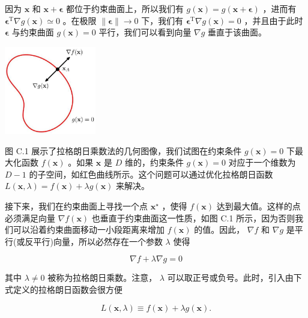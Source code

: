 \documentclass[10pt]{report}
\begin{document}
因为 \(\mathbf{x}\) 和 \(\mathbf{x} + \mathbf{\epsilon }\) 都位于约束曲面上，所以我们有 \(g\left( \mathbf{x}\right)  = g\left( {\mathbf{x} + \mathbf{\epsilon }}\right)\) ，进而有 \({\mathbf{\epsilon }}^{\mathrm{T}}\nabla g\left( \mathbf{x}\right)  \simeq  0\) 。在极限 \(\parallel \mathbf{\epsilon }\parallel  \rightarrow  0\) 下，我们有 \({\mathbf{\epsilon }}^{\mathrm{T}}\nabla g\left( \mathbf{x}\right)  = 0\) ，并且由于此时 \(\mathbf{\epsilon }\) 与约束曲面 \(g\left( \mathbf{x}\right)  = 0\) 平行，我们可以看到向量 \(\nabla g\) 垂直于该曲面。

\begin{center}
\includegraphics[max width=0.3\textwidth]{images/0194e279-9b28-703a-88f4-c3ac21e2010d_641_1087_344_461_443_0.jpg}
\end{center}
\hspace*{3em} 

图 C.1 展示了拉格朗日乘数法的几何图像，我们试图在约束条件 \(g\left( \mathbf{x}\right)  = 0\) 下最大化函数 \(f\left( \mathbf{x}\right)\) 。如果 \(\mathbf{x}\) 是 \(D\) 维的，约束条件 \(g\left( \mathbf{x}\right)  = 0\) 对应于一个维数为 \(D - 1\) 的子空间，如红色曲线所示。这个问题可以通过优化拉格朗日函数 \(L\left( {\mathbf{x},\lambda }\right)  = f\left( \mathbf{x}\right)  + {\lambda g}\left( \mathbf{x}\right)\) 来解决。

接下来，我们在约束曲面上寻找一个点 \({\mathbf{x}}^{ \star  }\) ，使得 \(f\left( \mathbf{x}\right)\) 达到最大值。这样的点必须满足向量 \(\nabla f\left( \mathbf{x}\right)\) 也垂直于约束曲面这一性质，如图 C.1 所示，因为否则我们可以沿着约束曲面移动一小段距离来增加 \(f\left( \mathbf{x}\right)\) 的值。因此， \(\nabla f\) 和 \(\nabla g\) 是平行(或反平行)向量，所以必然存在一个参数 \(\lambda\) 使得

\[
\nabla f + \lambda \nabla g = 0 \tag{C.3}
\]

其中 \(\lambda  \neq  0\) 被称为拉格朗日乘数。注意， \(\lambda\) 可以取正号或负号。此时，引入由下式定义的拉格朗日函数会很方便

\[
L\left( {\mathbf{x},\lambda }\right)  \equiv  f\left( \mathbf{x}\right)  + {\lambda g}\left( \mathbf{x}\right) . \tag{C.4}
\]
\end{document}
